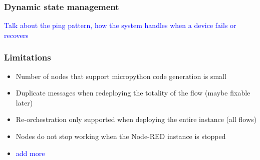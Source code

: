     

\subsubsection{Dynamic state management}\label{sec:dynamic_state_management}

\textcolor{blue}{Talk about the ping pattern, how the system handles when a device fails or recovers}

\subsubsection{Limitations}\label{sec:limitations}

\begin{itemize}
    \item Number of nodes that support micropython code generation is small
    \item Duplicate messages when redeploying the totality of the flow (maybe fixable later)
    \item Re-orchestration only supported when deploying the entire instance (all flows)
    \item Nodes do not stop working when the Node-RED instance is stopped
    \item \textcolor{blue}{add more}
\end{itemize}
